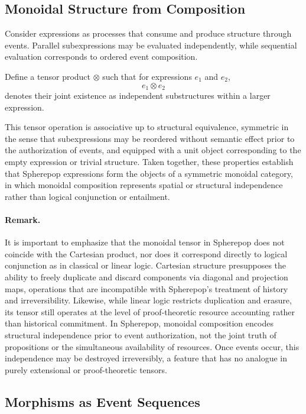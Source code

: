 \documentclass[11pt]{article}
\begin{document}
\subsection{Monoidal Structure from Composition}

Consider expressions as processes that consume and produce structure through events. Parallel subexpressions may be evaluated independently, while sequential evaluation corresponds to ordered event composition.

Define a tensor product $\otimes$ such that for expressions $e_1$ and $e_2$,
\[
e_1 \otimes e_2
\]
denotes their joint existence as independent substructures within a larger expression.

This tensor operation is associative up to structural equivalence, symmetric in the sense that subexpressions may be reordered without semantic effect prior to the authorization of events, and equipped with a unit object corresponding to the empty expression or trivial structure. Taken together, these properties establish that Spherepop expressions form the objects of a symmetric monoidal category, in which monoidal composition represents spatial or structural independence rather than logical conjunction or entailment.

\paragraph{Remark.}
It is important to emphasize that the monoidal tensor in Spherepop does not coincide with the Cartesian product, nor does it correspond directly to logical conjunction as in classical or linear logic. Cartesian structure presupposes the ability to freely duplicate and discard components via diagonal and projection maps, operations that are incompatible with Spherepop’s treatment of history and irreversibility. Likewise, while linear logic restricts duplication and erasure, its tensor still operates at the level of proof-theoretic resource accounting rather than historical commitment. In Spherepop, monoidal composition encodes structural independence prior to event authorization, not the joint truth of propositions or the simultaneous availability of resources. Once events occur, this independence may be destroyed irreversibly, a feature that has no analogue in purely extensional or proof-theoretic tensors.


\subsection{Morphisms as Event Sequences}
\end{document}
